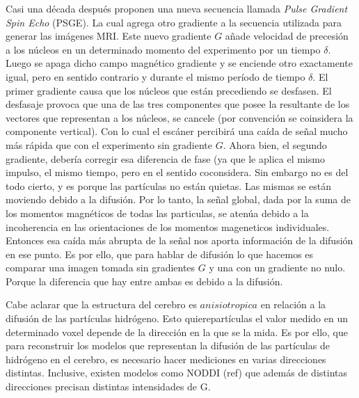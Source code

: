 Casi una d\'ecada despu\'es \citet{Stejskal1965} proponen una nueva secuencia 
llamada \textit{Pulse Gradient Spin Echo} (PSGE). La cual agrega otro
gradiente a la secuencia utilizada para generar las imágenes MRI. Este nuevo 
gradiente $G$ a\~nade velocidad de precesi\'on a los n\'ucleos en un 
determinado momento del experimento por un tiempo $\delta$. Luego se apaga dicho 
campo magn\'etico gradiente y se enciende otro exactamente igual, pero en 
sentido contrario y durante el mismo per\'iodo de tiempo $\delta$. El primer 
gradiente causa que los n\'ucleos que est\'an precediendo se desfasen. 
El desfasaje provoca que una de las tres componentes que posee la resultante de los vectores que 
representan a los n\'ucleos, se cancele (por convenci\'on se coinsidera la componente vertical). 
Con 
lo cual el escáner percibir\'a una ca\'ida de se\~nal mucho m\'as r\'apida que con el experimento 
sin gradiente $G$. Ahora bien, el segundo gradiente, debería  corregir esa diferencia de fase (ya 
que le aplica el mismo impulso, el mismo tiempo, pero en el sentido coconsidera. Sin embargo no es 
del todo cierto, y es porque las part\'iculas no est\'an quietas. Las mismas se est\'an moviendo 
debido a la difusi\'on. Por lo tanto, la señal global, dada por la suma de los momentos magnéticos 
de todas las particulas, se atenúa debido a la incoherencia en las orientaciones de los momentos 
mageneticos
individuales. Entonces esa caída más abrupta de la señal nos 
aporta informaci\'on de la difusión en ese punto. Es por ello, que para 
hablar de difusi\'on lo que hacemos es comparar una 
imagen tomada sin gradientes $G$ y una con un gradiente no nulo. Porque la 
diferencia que hay entre ambas es debido a la difusi\'on.



Cabe aclarar que la estructura del cerebro es $anisiotropica$ en relación 
a la difusión de las part\'iculas hidrógeno. Esto quierepartículas el valor 
medido en un determinado voxel depende de la direcci\'on en la que se la mida. 
Es por ello, que para reconstruir los modelos que 
representan la difusi\'on de las partículas de hidrógeno en el cerebro, es 
necesario hacer mediciones en varias direcciones distintas. Inclusive, existen 
modelos como NODDI (ref) que adem\'as de distintas direcciones precisan 
distintas intensidades de G. 

